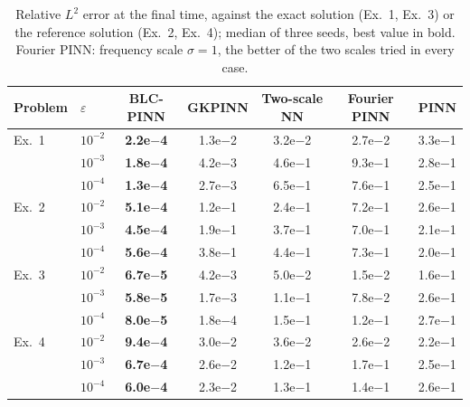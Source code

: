 \begin{table}[!htb]
\centering\small
\setlength{\tabcolsep}{3.5pt}
\caption{Relative $L^2$ error at the final time, against the exact solution (Ex.~1, Ex.~3) or the reference solution (Ex.~2, Ex.~4); median of three seeds, best value in bold. Fourier PINN: frequency scale $\sigma=1$, the better of the two scales tried in every case.}
\label{tab:main-l2}
\begin{tabular}{llccccc}
\toprule
Problem & $\varepsilon$ & BLC-PINN & GKPINN & Two-scale NN & Fourier PINN & PINN \\
\midrule
Ex.~1 & $10^{-2}$ & \textbf{2.2e$-$4} & 1.3e$-$2 & 3.2e$-$2 & 2.7e$-$2 & 3.3e$-$1 \\
 & $10^{-3}$ & \textbf{1.8e$-$4} & 4.2e$-$3 & 4.6e$-$1 & 9.3e$-$1 & 2.8e$-$1 \\
 & $10^{-4}$ & \textbf{1.3e$-$4} & 2.7e$-$3 & 6.5e$-$1 & 7.6e$-$1 & 2.5e$-$1 \\
\addlinespace
Ex.~2 & $10^{-2}$ & \textbf{5.1e$-$4} & 1.2e$-$1 & 2.4e$-$1 & 7.2e$-$1 & 2.6e$-$1 \\
 & $10^{-3}$ & \textbf{4.5e$-$4} & 1.9e$-$1 & 3.7e$-$1 & 7.0e$-$1 & 2.1e$-$1 \\
 & $10^{-4}$ & \textbf{5.6e$-$4} & 3.8e$-$1 & 4.4e$-$1 & 7.3e$-$1 & 2.0e$-$1 \\
\addlinespace
Ex.~3 & $10^{-2}$ & \textbf{6.7e$-$5} & 4.2e$-$3 & 5.0e$-$2 & 1.5e$-$2 & 1.6e$-$1 \\
 & $10^{-3}$ & \textbf{5.8e$-$5} & 1.7e$-$3 & 1.1e$-$1 & 7.8e$-$2 & 2.6e$-$1 \\
 & $10^{-4}$ & \textbf{8.0e$-$5} & 1.8e$-$4 & 1.5e$-$1 & 1.2e$-$1 & 2.7e$-$1 \\
\addlinespace
Ex.~4 & $10^{-2}$ & \textbf{9.4e$-$4} & 3.0e$-$2 & 3.6e$-$2 & 2.6e$-$2 & 2.2e$-$1 \\
 & $10^{-3}$ & \textbf{6.7e$-$4} & 2.6e$-$2 & 1.2e$-$1 & 1.7e$-$1 & 2.5e$-$1 \\
 & $10^{-4}$ & \textbf{6.0e$-$4} & 2.3e$-$2 & 1.3e$-$1 & 1.4e$-$1 & 2.6e$-$1 \\
\bottomrule
\end{tabular}
\end{table}
